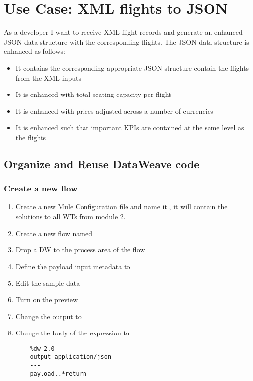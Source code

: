 \chapter{ Use Case: XML flights to JSON }
As a developer I want to receive XML flight records and generate an enhanced JSON data structure with the corresponding flights.
\newline
The JSON data structure is enhanced as follows:
\begin{itemize}
\item It contains the corresponding appropriate JSON structure contain the flights from the XML inputs
\item It is enhanced with total seating capacity per flight
\item It is enhanced with prices adjusted across a number of currencies
\item It is enhanced such that important KPIs are contained at the same level as the flights
\end{itemize}
\section{Organize and Reuse DataWeave code}

\subsection{Create a new flow}
\begin{enumerate}
\item Create a new Mule Configuration file and name it , it will contain the solutions to all WTs from module 2.
\item Create a new flow named 
\item Drop a DW to the process area of the flow
\item Define the payload input metadata to  
\item Edit the sample data
\item Turn on the preview
\item Change the output to 
\item Change the body of the expression to
  \begin{verbatim}
    %dw 2.0
    output application/json
    ---
    payload..*return
  \end{verbatim}
\end{enumerate}

